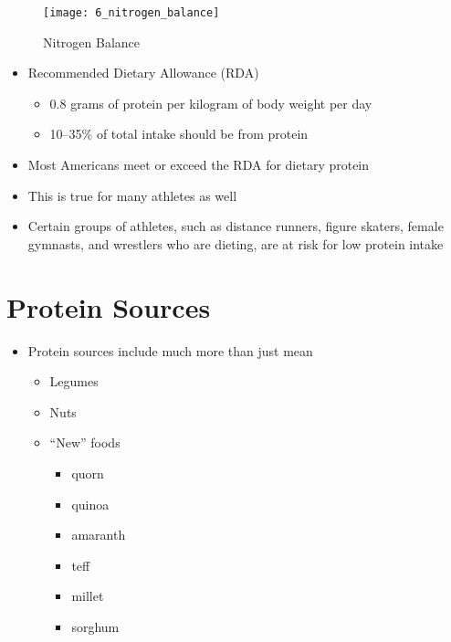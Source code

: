 \documentclass[title={Chapter 6}]{fdsn201notes}
\begin{document}
\begin{figure}[H]
	\centering
	\texttt{[image: 6\_nitrogen\_balance]}
	\caption{Nitrogen Balance}
	\label{fig:nitrogen-balance}
\end{figure}

\begin{itemize}
	\item Recommended Dietary Allowance (RDA)
	\begin{itemize}
		\item 0.8 grams of protein per kilogram of body weight per day
		\item 10--35\% of total intake should be from protein
	\end{itemize}
	\item Most Americans meet or exceed the RDA for dietary protein
	\item This is true for many athletes as well
	\item Certain groups of athletes, such as distance runners, figure skaters, female gymnasts, and wrestlers who are dieting, are at risk for low protein intake
\end{itemize}

\section{Protein Sources}\label{sec:protein-sources}
\begin{itemize}
	\item Protein sources include much more than just mean
	\begin{itemize}
		\item Legumes
		\item Nuts
		\item ``New'' foods
		\begin{itemize}
			\item quorn
			\item quinoa
			\item amaranth
			\item teff
			\item millet
			\item sorghum
		\end{itemize}
	\end{itemize}
\end{itemize}
\end{document}
